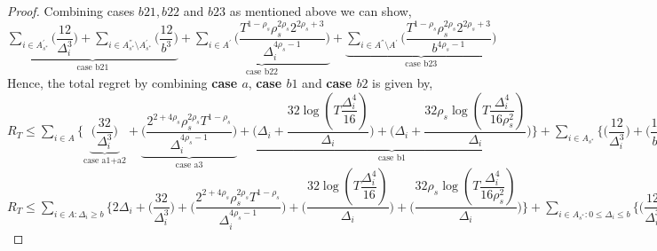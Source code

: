 \begin{proof}
Combining cases $b21,b22$ and $b23$ as mentioned above we can show,
\newline
$\underbrace{\sum_{i\in A^{'}_{s^{*}}}\bigg(\dfrac{12}{\Delta_{i}^{3}} \bigg)+\sum_{i\in A^{''}_{s^{*}}\setminus A^{'}_{s^{*}}}\bigg(\dfrac{12}{b^{3}} \bigg)}_{\text{case b21}} + \underbrace{\sum_{i\in A^{'}}\bigg(\dfrac{T^{1-\rho_{s}}\rho_{s}^{2\rho_{s}}2^{2\rho_{s}+3}}{\Delta_{i}^{4\rho_{s}-1}} \bigg)}_{\text{case b22}}+\underbrace{\sum_{i\in A^{''}\setminus A^{'}}\bigg(\dfrac{T^{1-\rho_{s}}\rho_{s}^{2\rho_{s}}2^{2\rho_{s}+3}}{b^{4\rho_{s} -1}} \bigg)}_{\text{case b23}}$
\newline
Hence, the total regret by combining \textbf{case $a$}, \textbf{case $b1$} and \textbf{case $b2$} is given by,
\newline
$R_{T}\leq \sum_{i\in A} \bigg\lbrace  \underbrace{\bigg(\dfrac{32}{\Delta_{i}^{3}}\bigg)}_{\text{case a1+a2}} + \underbrace{  \bigg(\dfrac{2^{2+4\rho_{s}}\rho_{s}^{2\rho_{s}}T^{1-\rho_{s}}}{\Delta_{i}^{4\rho_{s}-1}}\bigg)}_{\text{case a3}} + \underbrace{\bigg(\Delta_{i}+\dfrac{32\log{(T\dfrac{\Delta_{i}^{4}}{16})}}{\Delta_{i}}\bigg) + \bigg(\Delta_{i}+\dfrac{32\rho_{s}\log{(T\dfrac{\Delta_{i}^{4}}{16\rho_{s}^{2}})}}{\Delta_{i}}\bigg)}_{\text{case b1}}\bigg\rbrace + \underbrace{\sum_{i\in A_{s^{*}}}\bigg\lbrace \bigg(\dfrac{12}{\Delta_{i}^{3}} \bigg) + \bigg(\dfrac{12}{b^{3}} \bigg)\bigg\rbrace + \sum_{i\in A}\bigg\lbrace \bigg(\dfrac{T^{1-\rho_{s}}\rho_{s}^{2\rho_{s}}2^{2\rho_{s}+3}}{\Delta_{i}^{4\rho_{s}-1}} \bigg)+\bigg(\dfrac{T^{1-\rho_{s}}\rho_{s}^{2\rho_{s}}2^{2\rho_{s}+3}}{b^{4\rho_{s} -1}} \bigg)}_{\text{case b2}} \bigg\rbrace + max_{i:\Delta_{i}\leq b}\Delta_{i}T $
\newline
$R_{T}\leq \sum_{i\in A:\Delta_{i}\geq b} \bigg\lbrace 2\Delta_{i}+ \bigg(\dfrac{32}{\Delta_{i}^{3}}\bigg) + \bigg(\dfrac{2^{2+4\rho_{s}}\rho_{s}^{2\rho_{s}}T^{1-\rho_{s}}}{\Delta_{i}^{4\rho_{s}-1}}\bigg) + \bigg(\dfrac{32\log{(T\dfrac{\Delta_{i}^{4}}{16})}}{\Delta_{i}}\bigg) + \bigg(\dfrac{32\rho_{s}\log{(T\dfrac{\Delta_{i}^{4}}{16\rho_{s}^{2}})}}{\Delta_{i}}\bigg)\bigg\rbrace + \sum_{i\in A_{s^{*}}:0\leq\Delta_{i}\leq b}\bigg\lbrace \bigg(\dfrac{12}{\Delta_{i}^{3}} \bigg) + \bigg(\dfrac{12}{b^{3}} \bigg)\bigg\rbrace + \sum_{i\in A:0\leq\Delta_{i}\leq b}\bigg\lbrace \bigg(\dfrac{T^{1-\rho_{s}}\rho_{s}^{2\rho_{s}}2^{2\rho_{s}+3}}{\Delta_{i}^{4\rho_{s}-1}} \bigg)+\bigg(\dfrac{T^{1-\rho_{s}}\rho_{s}^{2\rho_{s}}2^{2\rho_{s}+3}}{b^{4\rho_{s} -1}} \bigg) \bigg\rbrace + max_{i:\Delta_{i}\leq b}\Delta_{i}T $

\end{proof}
